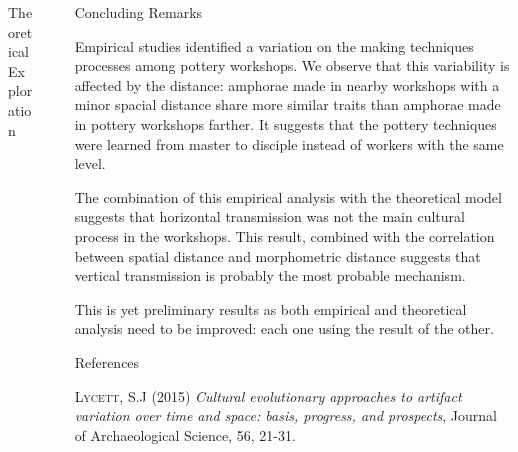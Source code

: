 \documentclass[final]{beamer}
\newlength{\sepwid}
\newlength{\onecolwid}
\newlength{\twocolwid}
\begin{document}
\begin{frame}[t]
\begin{columns}[t]
\begin{column}{\twocolwid}
\begin{block}{Theoretical Exploration}
\end{block}
\end{column}


\begin{column}{\sepwid}\end{column} %

\begin{column}{\onecolwid} %

\begin{block}{Concluding Remarks}
\justify

Empirical studies identified a variation on the making techniques processes among pottery workshops. We observe that this variability is affected by the distance: amphorae made in nearby workshops with a minor spacial distance share more similar traits than amphorae made in pottery workshops farther. It suggests that the pottery techniques were learned from master to disciple instead of workers with the same level. 

The combination of this empirical analysis with the theoretical model suggests that horizontal transmission was not the main cultural process in the workshops. This result, combined with the correlation between spatial distance and morphometric distance suggests that vertical transmission is probably the most probable mechanism.

This is yet  preliminary results as both empirical and theoretical analysis need to be improved: each one using the result of the other. 

 
\end{block}

\begin{block}{References}
\small

\begin{thebibliography}{50}

\textsc{Lycett, S.J (2015)}
\textit{Cultural evolutionary approaches to artifact variation over time and space: basis, progress, and prospects}, Journal of Archaeological Science, 56, 21-31.


\end{thebibliography}
\end{block}
\end{column}
\end{columns}
\end{frame}
\end{document}
